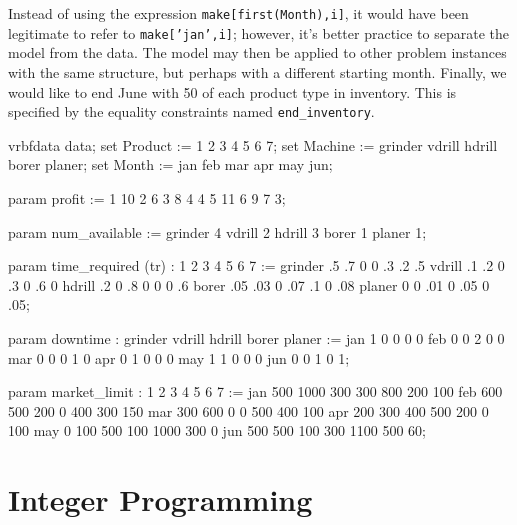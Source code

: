 Instead of using the expression \texttt{make[first(Month),i]},
it would have been legitimate to refer to \texttt{make['jan',i]}; however,
it's better practice to separate the model from the data. The model may then
be applied to other problem instances with the same structure, but perhaps with
a different starting month. Finally, we would like to end June with 50 of
each product type in inventory. This is specified by the equality constraints
named \texttt{end\_inventory}.

\begin{SaveVerbatim}{vrbfdata}
data;
set Product := 1 2 3 4 5 6 7;
set Machine := grinder vdrill hdrill borer planer;
set Month := jan feb mar apr may jun;

param profit := 1 10 2 6 3 8 4 4 5 11 6 9 7 3;

param num_available :=	
grinder 4 vdrill 2 hdrill 3 borer 1 planer 1;

param time_required (tr) :
         1   2   3   4   5   6   7 :=
grinder .5  .7   0   0  .3  .2  .5
vdrill  .1  .2   0  .3   0  .6   0
hdrill  .2   0  .8   0   0   0  .6
borer  .05 .03   0 .07  .1   0 .08
planer   0   0 .01   0 .05   0 .05;

param downtime :
     grinder vdrill hdrill borer planer :=
jan    1       0     0      0     0
feb    0       0     2      0     0
mar    0       0     0      1     0
apr    0       1     0      0     0
may    1       1     0      0     0
jun    0       0     1      0     1;

param market_limit :
       1     2     3     4     5     6     7 :=
jan  500  1000   300   300   800   200   100
feb  600   500   200     0   400   300   150
mar  300   600     0     0   500   400   100
apr  200   300   400   500   200     0   100
may    0   100   500   100  1000   300     0
jun  500   500   100   300  1100   500    60;
\end{SaveVerbatim}

\begin{figure}
\end{figure}

\section{Integer Programming}

